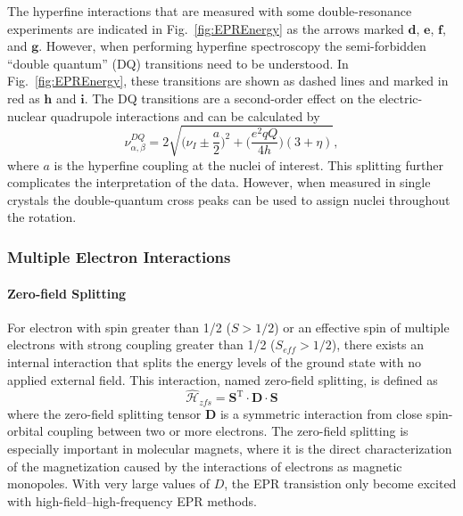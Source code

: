 The hyperfine interactions that are measured with some double-resonance experiments are indicated in Fig.~\ref{fig:EPREnergy} as the arrows marked $\mathbf{d}$, $\mathbf{e}$, $\mathbf{f}$, and $\mathbf{g}$. However, when performing hyperfine spectroscopy the semi-forbidden ``double quantum'' (DQ) transitions need to be understood. In Fig.~\ref{fig:EPREnergy}, these transitions are shown as dashed lines and marked in red as $\mathbf{h}$ and $\mathbf{i}$. The DQ transitions are a second-order effect on the electric-nuclear quadrupole interactions and can be calculated by
\begin{equation}
\nu^{DQ}_{\alpha, \beta} = 2 \sqrt{\bigg(\nu_I \pm \frac{a}{2}\bigg)^2+\bigg(\frac{e^2 q Q}{4 h}\bigg)(3+\eta)}, \label{eq-2:doubleQ}
\end{equation}
where $a$ is the hyperfine coupling at the nuclei of interest. \cite{Doorslaer2007} This splitting further complicates the interpretation of the data. However, when measured in single crystals the double-quantum cross peaks can be used to assign nuclei throughout the rotation.

\subsubsection*{Multiple Electron Interactions}
\paragraph*{Zero-field Splitting}
For electron with spin greater than 1/2 ($S > 1/2$) or an effective spin of multiple electrons with strong coupling greater than 1/2 ($S_{eff} > 1/2$), there exists an internal interaction that splits the energy levels of the ground state with no applied external field. This interaction, named zero-field splitting, is defined as 
\begin{equation}
    \hat{\mathcal{H}}_{zfs} = \mathbf{S}^{\text{T} } \cdot \mathbf{D} \cdot \mathbf{S}
\end{equation}
where the zero-field splitting tensor $\mathbf{D}$ is a symmetric interaction from close spin-orbital coupling between two or more electrons. The zero-field splitting is especially important in molecular magnets, where it is the direct characterization of the magnetization caused by the interactions of electrons as magnetic monopoles. \cite{barra1998high} With very large values of $D$, the EPR transistion only become excited with high-field--high-frequency EPR methods. \cite{Nehrkorn13} 

